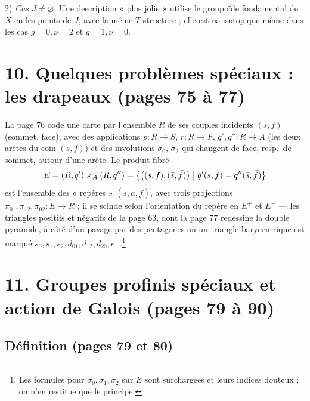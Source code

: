 \documentclass[11pt,a4paper]{article}
\begin{document}
2) \emph{Cas $J \neq \varnothing$.} Une description « plus jolie » utilise le
groupoïde fondamental de $X$ en les points de $J$, avec la même $T$-structure ;
elle est $\infty$-isotopique même dans les cas $g = 0, \nu = 2$ et $g = 1, \nu =
0$.

\section*{10. Quelques problèmes spéciaux : les drapeaux (pages 75 à 77)}

La page 76 code une carte par l'ensemble $R$ de ses couples incidents $(s, f)$
(sommet, face), avec des applications $p : R \to S$, $r : R \to F$, $q', q'' : R
\to A$ (les deux arêtes du coin $(s, f)$) et des involutions $\sigma_{0}$,
$\sigma_{2}$ qui changent de face, resp.\ de sommet, autour d'une arête. Le
produit fibré
\[
E = (R, q') \times_{A} (R, q'') = \bigl\{\bigl((s, f), (\bar{s}, \bar{f})\bigr)
\bigm| q'(s, f) = q''(\bar{s}, \bar{f})\bigr\}
\]
est l'ensemble des « repères » $(s, a, \bar{f})$, avec trois projections
$\pi_{01}, \pi_{12}, \pi_{02} : E \to R$ ; il se scinde selon l'orientation du
repère en $E^{+}$ et $E^{-}$ --- les triangles positifs et négatifs de la
page 63, dont la page 77 redessine la double pyramide, à côté d'un pavage par
des pentagones où un triangle barycentrique est marqué $s_{0}, s_{1}, s_{2},
d_{01}, d_{12}, d_{20}, e^{+}$.\footnote{Les formules pour $\sigma_{0}, \sigma_{1},
\sigma_{2}$ sur $E$ sont surchargées et leurs indices douteux ; on n'en
restitue que le principe.}

\section*{11. Groupes profinis spéciaux et action de Galois (pages 79 à 90)}

\subsection*{Définition (pages 79 et 80)}
\end{document}
